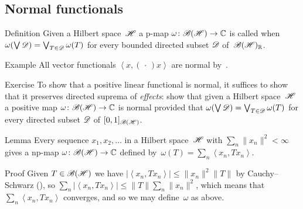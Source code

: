 \documentclass[a]{subfiles}
\begin{document}
\subsection{Normal functionals}
\begin{parsec}%
\begin{point}{Definition}%
Given a Hilbert space~$\mathscr{H}$
a p-map $\omega\colon \mathscr{B}(\mathscr{H})\to\mathbb{C}$
is called %
when
$\omega(\bigvee \mathscr{D})=\bigvee_{T\in\mathscr{D}} \omega(T)$
for every bounded directed subset $\mathscr{D}$ of~$\mathscr{B}(\mathscr{H})_{\mathbb{R}}$.
\end{point}
\begin{point}{Example}%
All vector functionals%
$\left<x,(\,\cdot\,)x\right>$ are normal by~.
\end{point}
\begin{point}{Exercise}%
To show that a positive linear functional is normal, it suffices to show 
that it preserves directed suprema of \emph{effects}: 
show that given a Hilbert space~$\mathscr{H}$
a  positive map $\omega\colon \mathscr{B}(\mathscr{H})\to\mathbb{C}$
is normal 
provided that $\omega(\bigvee \mathscr{D}) = \bigvee_{T\in\mathscr{D}} \omega(T)$
for every directed subset $\mathscr{D}$ of $[0,1]_{\mathscr{B}(\mathscr{H})}$.
\end{point}
\begin{point}{Lemma}%
Every sequence $x_1,x_2,\dotsc $ in a Hilbert space~$\mathscr{H}$
with $\sum_n \|x_n\|^2 < \infty$
gives a np-map $\omega\colon\mathscr{B}(\mathscr{H})\to\mathbb{C}$
defined by~$\omega(T)=\sum_n \left<x_n,Tx_n\right>$.
\begin{point}{Proof}%
Given $T\in\mathscr{B}(\mathscr{H})$ 
we have $\left|\left<x_n,Tx_n\right>\right|\leq \|x_n\|^2\|T\|$ 
by Cauchy--Schwarz (),
so $\sum_n \left|\left<x_n,Tx_n\right>\right|
\leq \|T\| \sum_n \|x_n\|^2$,
which means that~$\sum_n \left<x_n,Tx_n\right>$
converges, 
and so we may define~$\omega$ as above.


\end{point}
\end{point}
\end{parsec}
\end{document}

